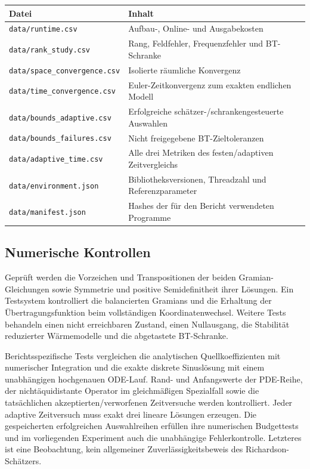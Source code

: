 \documentclass[11pt,a4paper]{article}
\begin{document}
\begin{table}[htbp]\centering\small
\begin{tabularx}{\linewidth}{p{65mm}X}\toprule
Datei & Inhalt\\\midrule
\texttt{data/runtime.csv} & Aufbau-, Online- und Ausgabekosten\\
\texttt{data/rank\_study.csv} & Rang, Feldfehler, Frequenzfehler und BT-Schranke\\
\texttt{data/space\_convergence.csv} & Isolierte räumliche Konvergenz\\
\texttt{data/time\_convergence.csv} & Euler-Zeitkonvergenz zum exakten endlichen Modell\\
\texttt{data/bounds\_adaptive.csv} & Erfolgreiche schätzer-/schrankengesteuerte Auswahlen\\
\texttt{data/bounds\_failures.csv} & Nicht freigegebene BT-Zieltoleranzen\\
\texttt{data/adaptive\_time.csv} & Alle drei Metriken des festen/adaptiven Zeitvergleichs\\
\texttt{data/environment.json} & Bibliotheksversionen, Threadzahl und Referenzparameter\\
\texttt{data/manifest.json} & Hashes der für den Bericht verwendeten Programme\\\bottomrule
\end{tabularx}
\end{table}

\subsection{Numerische Kontrollen}
Geprüft werden die Vorzeichen und Transpositionen der beiden Gramian-Gleichungen sowie Symmetrie und positive Semidefinitheit ihrer Lösungen. Ein Testsystem kontrolliert die balancierten Gramians und die Erhaltung der Übertragungsfunktion beim vollständigen Koordinatenwechsel. Weitere Tests behandeln einen nicht erreichbaren Zustand, einen Nullausgang, die Stabilität reduzierter Wärmemodelle und die abgetastete BT-Schranke.

Berichtsspezifische Tests vergleichen die analytischen Quellkoeffizienten mit numerischer Integration und die exakte diskrete Sinuslösung mit einem unabhängigen hochgenauen ODE-Lauf. Rand- und Anfangswerte der PDE-Reihe, der nichtäquidistante Operator im gleichmäßigen Spezialfall sowie die tatsächlichen akzeptierten/verworfenen Zeitversuche werden kontrolliert. Jeder adaptive Zeitversuch muss exakt drei lineare Lösungen erzeugen. Die gespeicherten erfolgreichen Auswahlreihen erfüllen ihre numerischen Budgettests und im vorliegenden Experiment auch die unabhängige Fehlerkontrolle. Letzteres ist eine Beobachtung, kein allgemeiner Zuverlässigkeitsbeweis des Richardson-Schätzers.
\end{document}
